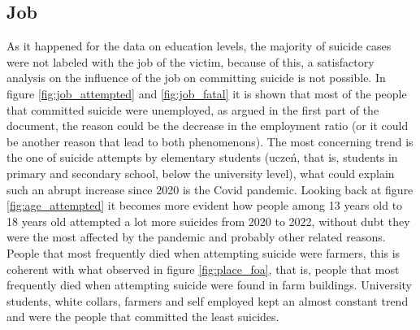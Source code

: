 \documentclass{article}
\begin{document}
\subsection{Job}
As it happened for the data on education levels,
the majority of suicide cases were not labeled with the 
job of the victim, because of this, a satisfactory analysis on
the influence of the job on committing suicide is not possible.
In figure \ref{fig:job_attempted} and \ref{fig:job_fatal}
it is shown that most of the people that committed suicide were unemployed,
as argued in the first part of the document,
the reason could be the decrease in the employment ratio
(or it could be another reason that lead to both phenomenons).
The most concerning trend is the one of suicide attempts by elementary students
(uczeń, that is, students in primary and secondary school, below the university level),
what could explain such an abrupt increase since 2020 is the Covid pandemic.
Looking back at figure \ref{fig:age_attempted} it becomes
more evident how people among 13 years old to 18 years old attempted a lot 
more suicides from 2020 to 2022, without dubt they were
the most affected by the pandemic and probably other related reasons.
People that most frequently died when attempting suicide
were farmers, this is coherent with what observed in figure \ref{fig:place_foa},
that is, people that most frequently died when attempting suicide were
found in farm buildings.
University students, white collars, farmers and self employed kept an almost constant
trend and were the people that committed the least suicides.
\end{document}
